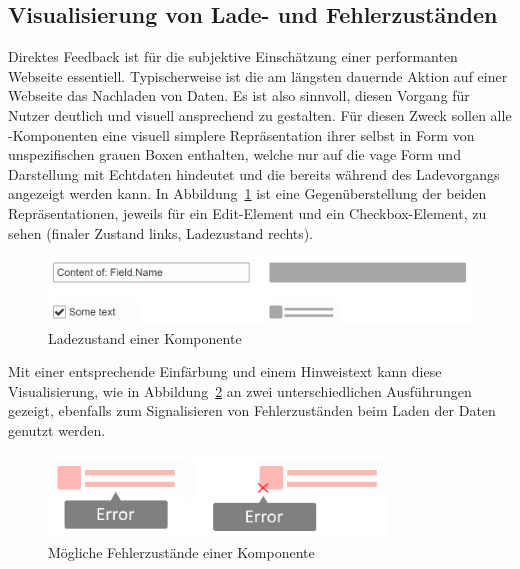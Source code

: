 \subsection{Visualisierung von Lade- und Fehlerzuständen}\label{subsec:loading_state_section}
Direktes Feedback ist für die subjektive Einschätzung einer performanten Webseite essentiell. Typischerweise ist die am längsten dauernde Aktion auf einer Webseite das Nachladen von Daten. Es ist also sinnvoll, diesen Vorgang für Nutzer deutlich und visuell ansprechend zu gestalten. Für diesen Zweck sollen alle -Komponenten eine visuell simplere Repräsentation ihrer selbst in Form von unspezifischen grauen Boxen enthalten, welche nur auf die vage Form und Darstellung mit Echtdaten hindeutet und die bereits während des Ladevorgangs angezeigt werden kann. In Abbildung~\ref{fig:comp_loading_final_comparison} ist eine Gegenüberstellung der beiden Repräsentationen, jeweils für ein Edit-Element und ein Checkbox-Element, zu sehen (finaler Zustand links, Ladezustand rechts).

\begin{figure}
    \centering
    \captionsetup{justification=centering}
    \includegraphics[width=\textwidth]{figures/comp_loading_final_comparison.png}
        \caption{Ladezustand einer Komponente}\label{fig:comp_loading_final_comparison}
\end{figure}

Mit einer entsprechende Einfärbung und einem Hinweistext kann diese Visualisierung, wie in Abbildung~\ref{fig:comp_possible_error_state} an zwei unterschiedlichen Ausführungen gezeigt, ebenfalls zum Signalisieren von Fehlerzuständen beim Laden der Daten genutzt werden.

\begin{figure}
    \centering
    \captionsetup{justification=centering}
    \includegraphics[width=0.8\textwidth]{figures/comp_possible_error_state.png}
        \caption{Mögliche Fehlerzustände einer Komponente}\label{fig:comp_possible_error_state}
\end{figure}

